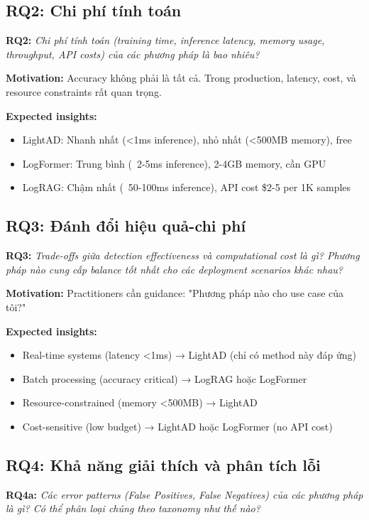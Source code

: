 \subsection{RQ2: Chi phí tính toán}

\textbf{RQ2:} \textit{Chi phí tính toán (training time, inference latency, memory usage, throughput, API costs) của các phương pháp là bao nhiêu?}

\textbf{Motivation:} Accuracy không phải là tất cả. Trong production, latency, cost, và resource constraints rất quan trọng.

\textbf{Expected insights:}
\begin{itemize}
    \item LightAD: Nhanh nhất (<1ms inference), nhỏ nhất (<500MB memory), free
    \item LogFormer: Trung bình (~2-5ms inference), 2-4GB memory, cần GPU
    \item LogRAG: Chậm nhất (~50-100ms inference), API cost \$2-5 per 1K samples
\end{itemize}

\subsection{RQ3: Đánh đổi hiệu quả-chi phí}

\textbf{RQ3:} \textit{Trade-offs giữa detection effectiveness và computational cost là gì? Phương pháp nào cung cấp balance tốt nhất cho các deployment scenarios khác nhau?}

\textbf{Motivation:} Practitioners cần guidance: "Phương pháp nào cho use case của tôi?"

\textbf{Expected insights:}
\begin{itemize}
    \item Real-time systems (latency <1ms) → LightAD (chỉ có method này đáp ứng)
    \item Batch processing (accuracy critical) → LogRAG hoặc LogFormer
    \item Resource-constrained (memory <500MB) → LightAD
    \item Cost-sensitive (low budget) → LightAD hoặc LogFormer (no API cost)
\end{itemize}

\subsection{RQ4: Khả năng giải thích và phân tích lỗi}

\textbf{RQ4a:} \textit{Các error patterns (False Positives, False Negatives) của các phương pháp là gì? Có thể phân loại chúng theo taxonomy như thế nào?}

